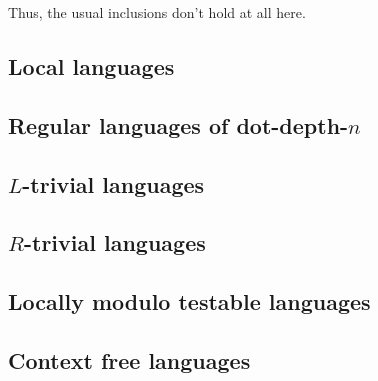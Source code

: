 Thus, the usual inclusions don't hold at all here.

\subsection{Local languages}
\label{lang:local}

\subsection{Regular languages of dot-depth-$n$}
\label{lang:dotdepth}

\subsection{$L$-trivial languages}
\label{lang:Ltrivial}
\subsection{$R$-trivial languages}
\label{lang:Rtrivial}
\subsection{Locally modulo testable languages}
\label{lang:LmodT}


\subsection{Context free languages}
\label{lang:contextfree}


